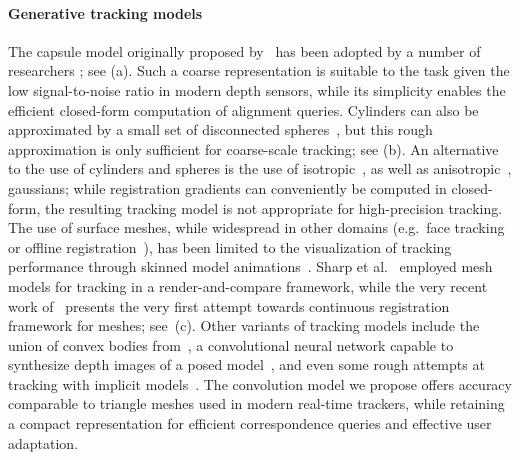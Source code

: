 \paragraph{Generative tracking models}
The capsule model originally proposed by~\cite{rehg1994tracking} has been adopted by a number of researchers \cite{oiko2011hand,schroder2014real,fleishman2015icpik,tagliasacchi2015robust}; see (a). Such a coarse representation is suitable to the task given the low signal-to-noise ratio in modern depth sensors, while its simplicity enables the efficient closed-form computation of alignment queries. Cylinders can also be approximated by a small set of disconnected spheres~\cite{qian2014realtime}, but this rough approximation is only sufficient for coarse-scale tracking; see (b). An alternative to the use of cylinders and spheres is the use of isotropic~\cite{sridhar2013multicam,sridhar2015fast}, as well as anisotropic~\cite{sridhar2014anisotropic}, gaussians; while registration gradients can conveniently be computed in closed-form, the resulting tracking model is not appropriate for high-precision tracking.
% 
%
The use of surface meshes, while widespread in other domains (e.g.\ face tracking~\cite{bouaziz2013online} or offline registration~\cite{wang2013physics,loper_eccv14}), has been limited to the visualization of tracking performance through skinned model animations~\cite{tompson2014real,schroder2014real}. Sharp et al.~ employed mesh models for tracking in a render-and-compare framework, while the very recent work of~\cite{taylor2016concerto} presents the very first attempt towards continuous registration framework for meshes; see~(c).
%
Other variants of tracking models include the union of convex bodies from~\cite{melax2013dynamics}, a convolutional neural network capable to synthesize depth images of a posed model~\cite{oberweger2015feedback}, and even some rough attempts at tracking with implicit models~\cite{fua2003soft}.
% 
The convolution model we propose offers accuracy comparable to triangle meshes used in modern real-time trackers, while retaining a compact representation for efficient correspondence queries and effective user adaptation.


